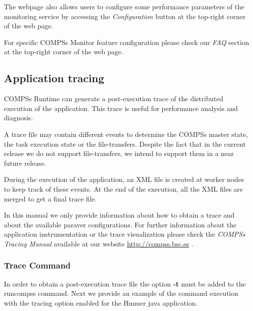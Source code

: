 
The webpage also allows users to configure some performance parameters of the monitoring service by accessing the 
\textit{Configuration} button at the top-right corner of the web page. 

For specific COMPSs Monitor feature configuration please check our \textit{FAQ} section at the top-right corner of the web page. 


\subsection{Application tracing}
\label{sec:Tracing}
COMPSs Runtime can generate a post-execution trace of the distributed execution of the application. This trace is useful for
performance analysis and diagnosis.

A trace file may contain different events to determine the COMPSs master state, the task execution state or the file-transfers.
Despite the fact that in the current release we do not support file-transfers, we intend to support them in a near future release.

During the execution of the application, an XML file is created at worker nodes to keep track of 
these events. At the end of the execution, all the XML files are merged to get a final trace file.

In this manual we only provide information about how to obtain a trace and about the available paraver configurations. For further
information about the application instrumentation or the trace visualization please check the \textit{COMPSs Tracing Manual} 
available at our website \url{http://compss.bsc.es} .

\subsubsection{Trace Command}
In order to obtain a post-execution trace file the option \textbf{-t}  must be added to the runcompss command. Next we provide an
example of the command execution with the tracing option enabled for the Hmmer java application.

